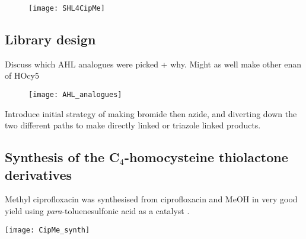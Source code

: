 
\begin{figure}[H]
	\begin{center}
		\texttt{[image: SHL4CipMe]}
		\caption{\label{fig:SHL4CipMe}}
	\end{center}
\end{figure}

\subsection{Library design}

Discuss which AHL analogues were picked + why.
Might as well make other enan of HOcy5

\begin{figure}[H]
	\begin{center}
		\texttt{[image: AHL\_analogues]}
		\caption{\label{fig:HL4_anas}}
	\end{center}
\end{figure}

Introduce initial strategy of making bromide then azide, and diverting down the two different paths to make directly linked or triazole linked products.





\subsection{Synthesis of the C$_4$-homocysteine thiolactone derivatives}

Methyl ciprofloxacin  was synthesised from ciprofloxacin  and MeOH in very good yield using \textit{para}-toluenesulfonic acid as a catalyst \cite{Sachin2010}.

\begin{scheme}[H]
	\begin{center}
		\texttt{[image: CipMe\_synth]}
		\caption{a) \textit{p}-TSA, MeOH, 72 h, reflux, 83.3 \%. \label{sch:CipMe_synth}}
	\end{center}
\end{scheme}

